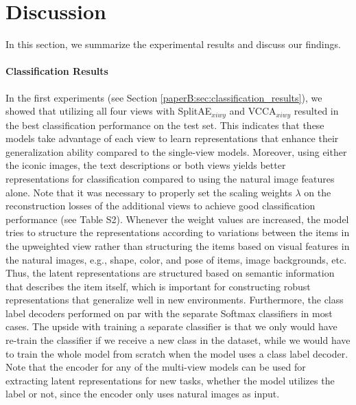\section{Discussion}\label{paperB:sec:discussion}

In this section, we summarize the experimental results and discuss our findings.

\vspace{-3mm}
\paragraph{Classification Results} In the first experiments (see Section \ref{paperB:sec:classification_results}), %
we showed that utilizing all four views with SplitAE$_{x i w y}$ and VCCA$_{x i w y}$ resulted in the best classification performance on the test set. This indicates that these models take advantage of each view to learn representations that enhance their generalization ability compared to the single-view models. Moreover, using either the iconic images, the text descriptions or both views yields better representations for classification compared to using the natural image features alone. Note that it was necessary to properly set the scaling weights $\lambda$ on the reconstruction losses of the additional views to achieve good classification performance (see Table S2).
Whenever the weight values are increased, the model tries to structure the representations according to variations between the items in the upweighted view rather than structuring the items based on visual features in the natural images, e.g., shape, color, and pose of items, image backgrounds, etc. 
Thus, the latent representations are structured based on semantic information that describes the item itself, which is important for constructing robust representations that generalize well in new environments. Furthermore, the class label decoders performed on par with the separate Softmax classifiers in most cases. The upside with training a separate classifier is that we only would have re-train the classifier if we receive a new class in the dataset, while we would have to train the whole model from scratch when the model uses a class label decoder. Note that the encoder for any of the multi-view models can be used for extracting latent representations for new tasks, whether the model utilizes the label or not, since the encoder only uses natural images as input. 

\vspace{-3mm}
